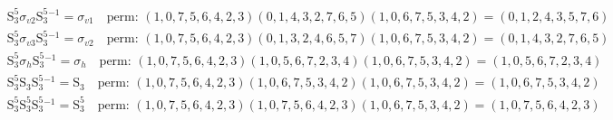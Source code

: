 \begin{align*}
& \mathrm{S}_{3}^{5} \sigma_{v2} \mathrm{S}_{3}^{5}^{-1} = \sigma_{v1} \quad \text{perm: }(1, 0, 7, 5, 6, 4, 2, 3)(0, 1, 4, 3, 2, 7, 6, 5)(1, 0, 6, 7, 5, 3, 4, 2) = (0, 1, 2, 4, 3, 5, 7, 6) \\
& \mathrm{S}_{3}^{5} \sigma_{v3} \mathrm{S}_{3}^{5}^{-1} = \sigma_{v2} \quad \text{perm: }(1, 0, 7, 5, 6, 4, 2, 3)(0, 1, 3, 2, 4, 6, 5, 7)(1, 0, 6, 7, 5, 3, 4, 2) = (0, 1, 4, 3, 2, 7, 6, 5) \\
& \mathrm{S}_{3}^{5} \sigma_{h} \mathrm{S}_{3}^{5}^{-1} = \sigma_{h} \quad \text{perm: }(1, 0, 7, 5, 6, 4, 2, 3)(1, 0, 5, 6, 7, 2, 3, 4)(1, 0, 6, 7, 5, 3, 4, 2) = (1, 0, 5, 6, 7, 2, 3, 4) \\
& \mathrm{S}_{3}^{5} \mathrm{S}_{3} \mathrm{S}_{3}^{5}^{-1} = \mathrm{S}_{3} \quad \text{perm: }(1, 0, 7, 5, 6, 4, 2, 3)(1, 0, 6, 7, 5, 3, 4, 2)(1, 0, 6, 7, 5, 3, 4, 2) = (1, 0, 6, 7, 5, 3, 4, 2) \\
& \mathrm{S}_{3}^{5} \mathrm{S}_{3}^{5} \mathrm{S}_{3}^{5}^{-1} = \mathrm{S}_{3}^{5} \quad \text{perm: }(1, 0, 7, 5, 6, 4, 2, 3)(1, 0, 7, 5, 6, 4, 2, 3)(1, 0, 6, 7, 5, 3, 4, 2) = (1, 0, 7, 5, 6, 4, 2, 3) \\
\end{align*}